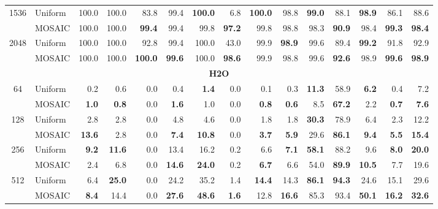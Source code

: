 \begin{table}[tp]
\begin{tabular}{@{} c l rrrrrrrrrrrrr @{}}
    \cmidrule(l){1-15}
    \multirow{2}{*}{1536} & Uniform & 100.0 & 100.0 & 83.8 & 99.4 & \textbf{100.0} & 6.8 & \textbf{100.0} & 98.8 & \textbf{99.0} & 88.1 & \textbf{98.9} & 86.1 & 88.6 \\
     & MOSAIC & 100.0 & 100.0 & \textbf{99.4} & 99.4 & 99.8 & \textbf{97.2} & 99.8 & 98.8 & 98.3 & \textbf{90.9} & 98.4 & \textbf{99.3} & \textbf{98.4} \\
    \cmidrule(l){1-15}
    \multirow{2}{*}{2048} & Uniform & 100.0 & 100.0 & 92.8 & 99.4 & 100.0 & 43.0 & 99.9 & \textbf{98.9} & 99.6 & 89.4 & \textbf{99.2} & 91.8 & 92.9 \\
     & MOSAIC & 100.0 & 100.0 & \textbf{100.0} & \textbf{99.6} & 100.0 & \textbf{98.6} & 99.9 & 98.8 & 99.6 & \textbf{92.6} & 98.9 & \textbf{99.6} & \textbf{98.9} \\
    \midrule
    \multicolumn{15}{c}{\textbf{H2O}} \\
    \midrule
    \multirow{2}{*}{64} & Uniform & 0.2 & 0.6 & 0.0 & 0.4 & \textbf{1.4} & 0.0 & 0.1 & 0.3 & \textbf{11.3} & 58.9 & \textbf{6.2} & 0.4 & 7.2 \\
     & MOSAIC & \textbf{1.0} & \textbf{0.8} & 0.0 & \textbf{1.6} & 1.0 & 0.0 & \textbf{0.8} & \textbf{0.6} & 8.5 & \textbf{67.2} & 2.2 & \textbf{0.7} & \textbf{7.6} \\
    \cmidrule(l){1-15}
    \multirow{2}{*}{128} & Uniform & 2.8 & 2.8 & 0.0 & 4.8 & 4.6 & 0.0 & 1.8 & 1.8 & \textbf{30.3} & 78.9 & 6.4 & 2.3 & 12.2 \\
     & MOSAIC & \textbf{13.6} & 2.8 & 0.0 & \textbf{7.4} & \textbf{10.8} & 0.0 & \textbf{3.7} & \textbf{5.9} & 29.6 & \textbf{86.1} & \textbf{9.4} & \textbf{5.5} & \textbf{15.4} \\
    \cmidrule(l){1-15}
    \multirow{2}{*}{256} & Uniform & \textbf{9.2} & \textbf{11.6} & 0.0 & 13.4 & 16.2 & 0.2 & 6.6 & \textbf{7.1} & \textbf{58.1} & 88.2 & 9.6 & \textbf{8.0} & \textbf{20.0} \\
     & MOSAIC & 2.4 & 6.8 & 0.0 & \textbf{14.6} & \textbf{24.0} & 0.2 & \textbf{6.7} & 6.6 & 54.0 & \textbf{89.9} & \textbf{10.5} & 7.7 & 19.6 \\
    \cmidrule(l){1-15}
    \multirow{2}{*}{512} & Uniform & 6.4 & \textbf{25.0} & 0.0 & 24.2 & 35.2 & 1.4 & \textbf{14.4} & 14.3 & \textbf{86.1} & \textbf{94.3} & 24.6 & 15.1 & 29.6 \\
     & MOSAIC & \textbf{8.4} & 14.4 & 0.0 & \textbf{27.6} & \textbf{48.6} & \textbf{1.6} & 12.8 & \textbf{16.6} & 85.3 & 93.4 & \textbf{50.1} & \textbf{16.2} & \textbf{32.6} \\

\end{tabular}
\end{table}
